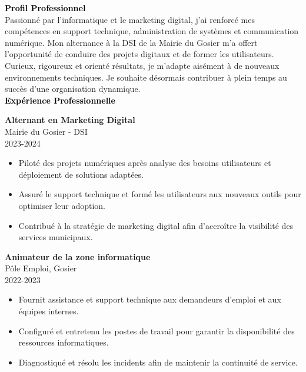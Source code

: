 \documentclass{article}
\begin{document}
\begin{paracol}{2}
\switchcolumn
\color{black}

\textcolor{black}{\Large \textbf{Profil Professionnel}} \\[2pt]
Passionné par l’informatique et le marketing digital, j’ai renforcé mes compétences en support technique, administration de systèmes et communication numérique. Mon alternance à la DSI de la Mairie du Gosier m’a offert l’opportunité de conduire des projets digitaux et de former les utilisateurs. Curieux, rigoureux et orienté résultats, je m’adapte aisément à de nouveaux environnements techniques. Je souhaite désormais contribuer à plein temps au succès d’une organisation dynamique. \\[8pt]

\textcolor{black}{\Large \textbf{Expérience Professionnelle}} \\[2pt]

\colorbox{maincolor}{%
  \begin{minipage}{\linewidth}
    \textbf{Alternant en Marketing Digital} \\ Mairie du Gosier - DSI \\ 2023-2024
    \begin{itemize}
      \item Piloté des projets numériques après analyse des besoins utilisateurs et déploiement de solutions adaptées. \item Assuré le support technique et formé les utilisateurs aux nouveaux outils pour optimiser leur adoption. \item Contribué à la stratégie de marketing digital afin d’accroître la visibilité des services municipaux.
    \end{itemize}
  \end{minipage}}

\vspace{3mm}


\colorbox{maincolor}{%
  \begin{minipage}{\linewidth}
    \textbf{Animateur de la zone informatique} \\ Pôle Emploi, Gosier \\ 2022-2023
    \begin{itemize}
      \item Fournit assistance et support technique aux demandeurs d’emploi et aux équipes internes. \item Configuré et entretenu les postes de travail pour garantir la disponibilité des ressources informatiques. \item Diagnostiqué et résolu les incidents afin de maintenir la continuité de service.
    \end{itemize}
  \end{minipage}}


\end{paracol}
\end{document}
